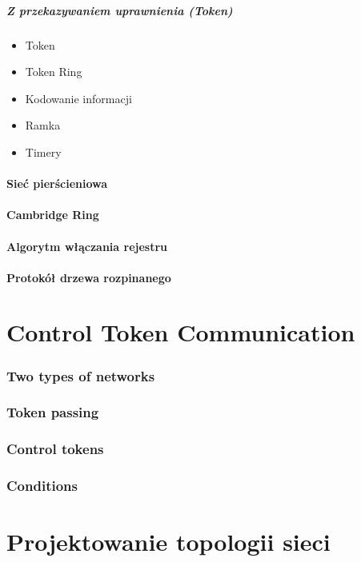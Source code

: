 \documentclass[a4paper,twoside]{article}
\begin{document}
		\subsubsection{Z przekazywaniem uprawnienia (Token)}
		\begin{itemize}
			\item Token
			\item Token Ring
			\item Kodowanie informacji
			\item Ramka
			\item Timery	
		\end{itemize}
	\subsection{Sieć pierścieniowa}
	\subsection{Cambridge Ring}
	\subsection{Algorytm włączania rejestru}
	\subsection{Protokół drzewa rozpinanego}
	
	
\part{Control Token Communication}
\section{Two types of networks}
\section{Token passing}
\section{Control tokens}
\section{Conditions}


\part{Projektowanie topologii sieci}
\end{document}
